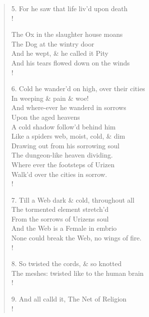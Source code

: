 \documentclass[9pt]{extarticle}
\begin{document}
\begin{verse}
\begin{altverse}
		5. For he saw that life liv'd upon death\\!
		
		The Ox in the slaughter house moans\\
		The Dog at the wintry door\\
		And he wept, \& he called it Pity\\
		And his tears flowed down on the winds\\!
		
		6. Cold he wander'd on high, over their cities\\
		In weeping \& pain \& woe!\\
		And where-ever he wanderd in sorrows\\
		Upon the aged heavens\\
		A cold shadow follow'd behind him\\
		Like a spiders web, moist, cold, \& dim\\
		Drawing out from his sorrowing soul\\
		The dungeon-like heaven dividing.\\
		Where ever the footsteps of Urizen\\
		Walk'd over the cities in sorrow.\\!
		
		7. Till a Web dark \& cold, throughout all\\
		The tormented element stretch'd\\
		From the sorrows of Urizens soul\\
		And the Web is a Female in embrio\\
		None could break the Web, no wings of fire.\\!
		
		8. So twisted the cords, \& so knotted\\
		The meshes: twisted like to the human brain\\!
		
		9. And all calld it, The Net of Religion\\!
		
\end{altverse}
\end{verse}	
\end{document}
